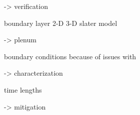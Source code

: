 
-> verification

boundary layer
2-D
3-D
slater model

-> plenum 

boundary conditions
because of issues with 

-> characterization

time lengths

-> mitigation